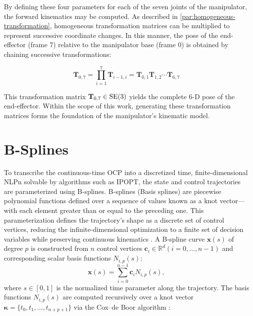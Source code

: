 By defining these four parameters for each of the seven joints of the manipulator, the forward kinematics may be computed. 
As described in \cref{par:homogeneous-transformation}, homogeneous transformation matrices can be multiplied to represent successive coordinate changes. 
In this manner, the pose of the end-effector (frame 7) relative to the manipulator base (frame 0) is obtained by chaining successive transformations:

\begin{equation}
    \mathbf{T}_{0, 7} = \prod_{i=1}^{7} \mathbf{T}_{i-1, i} = \mathbf{T}_{0, 1} \mathbf{T}_{1, 2} \cdots \mathbf{T}_{6, 7}
\label{eq:forward-kinematics-chain}
\end{equation}

This transformation matrix $\mathbf{T}_{0, 7} \in \mathrm{SE}(3)$ yields the complete 6-D pose of the end-effector. 
Within the scope of this work, generating these transformation matrices forms the foundation of the manipulator's kinematic model.

\section{B-Splines}
\label{sec:methodology-bsplines}

To transcribe the continuous-time \ac{OCP} into a discretized time, finite-dimensional \ac{NLPn} solvable by algorithms such as \ac{IPOPT}, the state and control trajectories are parameterized using B-splines.
B-splines (Basis splines) are piecewise polynomial functions defined over a sequence of values known as a knot vector---with each element greater than or equal to the preceding one. 
This parameterization defines the trajectory's shape as a discrete set of control vertices, reducing the infinite-dimensional optimization to a finite set of decision variables while preserving continuous kinematics \cite{Boor78}. 
A B-spline curve $\mathbf{x}(s)$ of degree $p$ is constructed from $n$ control vertices $\mathbf{c}_i \in \mathbb{R}^d (i = 0, \dots, n-1)$ and corresponding scalar basis functions $N_{i,p}(s)$:
\begin{equation}
\mathbf{x}(s) = \sum_{i=0}^{n-1} \mathbf{c}_i N_{i,p}(s),
\label{eq:bspline_curve}
\end{equation}
where $s \in [0, 1]$ is the normalized time parameter along the trajectory. 
The basis functions $N_{i,p}(s)$ are computed recursively over a knot vector $\boldsymbol{\kappa} = \{t_0, t_1, \dots, t_{n+p+1}\}$ via the Cox--de Boor algorithm \cite{Boor78}:


